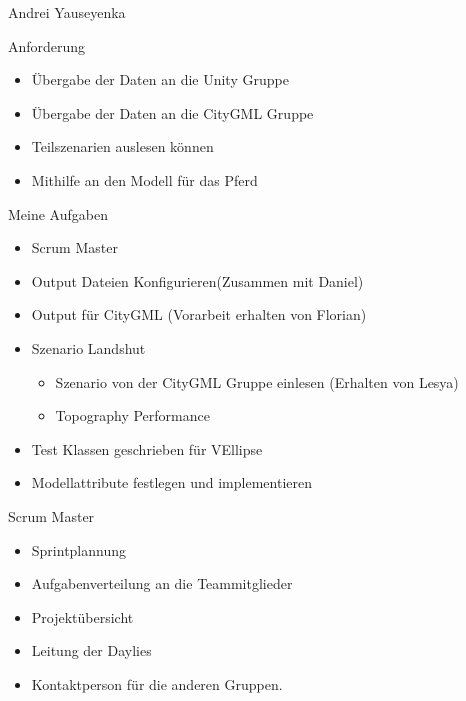 \graphicspath{{appendix/images/}}

\begin{frame}
	\begin{center}
		\begin{Large}
			Andrei Yauseyenka
		\end{Large}
	\end{center}
\end{frame}

\begin{frame}{Anforderung}
	\begin{itemize}
		\item Übergabe der Daten an die Unity Gruppe
		\item Übergabe der Daten an die CityGML Gruppe
		\item Teilszenarien auslesen können
		\item Mithilfe an den Modell für das Pferd
	\end{itemize}
\end{frame}

\begin{frame}{Meine Aufgaben}
	\begin{itemize}
		\item Scrum Master
		\item Output Dateien Konfigurieren(Zusammen mit Daniel)
		\item Output für CityGML (Vorarbeit erhalten von Florian)
		\item Szenario Landshut
		\begin{itemize}
			\item Szenario von der CityGML Gruppe einlesen (Erhalten von Lesya)
			\item Topography Performance
		\end{itemize}
		\item Test Klassen geschrieben für VEllipse
		\item Modellattribute festlegen und implementieren
	\end{itemize}
\end{frame}

\begin{frame}{Scrum Master}
	\begin{itemize}
		\item Sprintplannung 
		\item Aufgabenverteilung an die Teammitglieder
		\item Projektübersicht
		\item Leitung der Daylies
		\item Kontaktperson für die anderen Gruppen.
	\end{itemize}
\end{frame}

